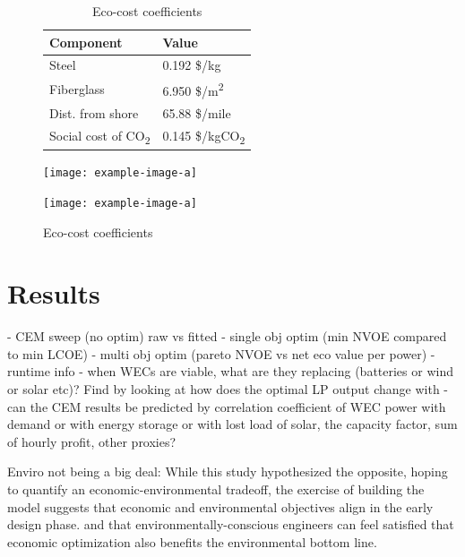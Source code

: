 \documentclass[10pt,twoside]{article}
\begin{document}
\begin{figure}[b]
\noindent
\begin{minipage}[b]{0.34\textwidth}
        \begin{table}[H]
    \begin{tabular}{ ll } 
        \hline
        Component & Value \\ 
        \hline
        Steel & 0.192 \$/kg \\ 
        Fiberglass & 6.950 \$/m\textsuperscript{2} \\ 
        Dist. from shore & 65.88 \$/mile \\ 
        Social cost of CO\textsubscript{2} & 0.145 \$/kgCO\textsubscript{2} \\
    \end{tabular}
    \caption{Eco-cost coefficients}
    \label{tab:lca-weights}
    \end{table}
\end{minipage}
\hfill
\begin{minipage}[b]{0.32\textwidth}
    \centering
    \texttt{[image: example-image-a]}
    \label{fig:four}
\end{minipage}
\hfill
\begin{minipage}[b]{0.32\textwidth}
    \centering
    \texttt{[image: example-image-a]}
    \label{fig:five}
\end{minipage}
\end{figure}

\section{Results}
    -  CEM sweep (no optim) raw vs fitted
    -  single obj optim (min NVOE compared to min LCOE)
    -  multi obj optim (pareto NVOE vs net eco value per power)
    -  runtime info
    -  when WECs are viable, what are they replacing (batteries or wind or solar etc)? Find by looking at how does the optimal LP output change with
    -  can the CEM results be predicted by correlation coefficient of WEC power with demand or with energy storage or with lost load of solar, the capacity factor, sum of hourly profit, other proxies?

    Enviro not being a big deal: While this study hypothesized the opposite, hoping to quantify an economic-environmental tradeoff, the exercise of building the model suggests that economic and environmental objectives align in the early design phase.
and that environmentally-conscious engineers can feel satisfied that economic optimization also benefits the environmental bottom line.
\end{document}
